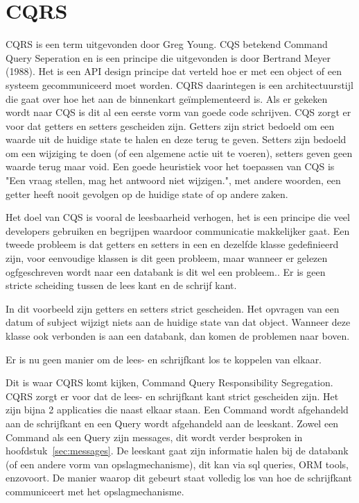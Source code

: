 
\chapter{CQRS}
\label{ch:CQRS}

CQRS is een term uitgevonden door Greg Young. CQS betekend Command Query Seperation en is een principe die uitgevonden is door Bertrand Meyer (1988). Het is een API design principe dat verteld hoe er met een object of een systeem gecommuniceerd moet worden. CQRS daarintegen is een architectuurstijl die gaat over hoe het aan de binnenkart geïmplementeerd is. Als er gekeken wordt naar CQS is dit al een eerste vorm van goede code schrijven. CQS zorgt er voor dat getters en setters gescheiden zijn. Getters zijn strict bedoeld om een waarde uit de huidige state te halen en deze terug te geven. Setters zijn bedoeld om een wijziging te doen (of een algemene actie uit te voeren), setters geven geen waarde terug maar void. Een goede heuristiek voor het toepassen van CQS is "Een vraag stellen, mag het antwoord niet wijzigen.", met andere woorden, een getter heeft nooit gevolgen op de huidige state of op andere zaken.

Het doel van CQS is vooral de leesbaarheid verhogen, het is een principe die veel developers gebruiken en begrijpen waardoor communicatie makkelijker gaat.
Een tweede probleem is dat getters en setters in een en dezelfde klasse gedefinieerd zijn, voor eenvoudige klassen is dit geen probleem, maar wanneer er gelezen ogfgeschreven wordt naar een databank is dit wel een probleem.. Er is geen stricte scheiding tussen de lees kant en de schrijf kant.


In dit voorbeeld zijn getters en setters strict gescheiden. Het opvragen van een datum of subject wijzigt niets aan de huidige state van dat object. Wanneer deze klasse ook verbonden is aan een databank, dan komen de problemen naar boven.


Er is nu geen manier om de lees- en schrijfkant los te koppelen van elkaar.

Dit is waar CQRS komt kijken, Command Query Responsibility Segregation. CQRS zorgt er voor dat de lees- en schrijfkant kant strict gescheiden zijn. Het zijn bijna 2 applicaties die naast elkaar staan. Een Command wordt afgehandeld aan de schrijfkant en een Query wordt afgehandeld aan de leeskant. Zowel een Command als een Query zijn messages, dit wordt verder besproken in hoofdstuk~\ref{sec:messages}. De leeskant gaat zijn informatie halen bij de databank (of een andere vorm van opslagmechanisme), dit kan via sql queries, ORM tools, enzovoort. De manier waarop dit gebeurt staat volledig los van hoe de schrijfkant communiceert met het opslagmechanisme. 

